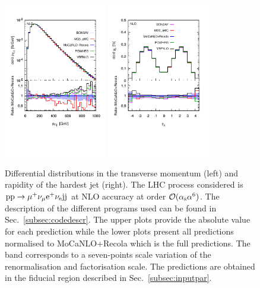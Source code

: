  \begin{figure}[hbt!]
   \centering
   \includegraphics[width=0.4\textwidth,angle=0,clip=true,trim={0.4cm 2cm 0.cm 1.cm}]{figures/NLO/ptj1_NLO.pdf}
   \includegraphics[width=0.4\textwidth,angle=0,clip=true,trim={0.4cm 2cm 0.cm 1.cm}]{figures/NLO/yj1_NLO.pdf}
\caption{\label{fig:distNLO2} Differential distributions in the transverse momentum (left) and rapidity of the hardest jet (right).
The LHC process considered is ${\rm p}{\rm p}\to\mu^+\nu_\mu{\rm e}^+\nu_{\rm e}{\rm j}{\rm j}$ at NLO accuracy at order $\mathcal{O}(\alpha_{\rm s}\alpha^6)$.
The description of the different programs used can be found in Sec.~\ref{subsec:codedescr}.
The upper plots provide the absolute value for each prediction while the lower plots present all predictions normalised to {\sc MoCaNLO}+{\sc Recola} which is the full predictions.
The band corresponds to a seven-points scale variation of the renormalisation and factorisation scale.
The predictions are obtained in the fiducial region described in Sec.~\ref{subsec:inputpar}.
}
\end{figure}


